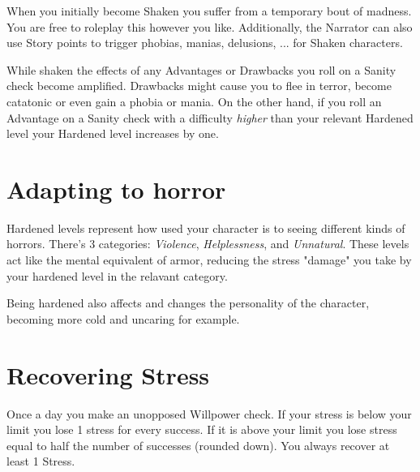 When you initially become Shaken you suffer from a temporary bout of madness. 
You are free to roleplay this however you like. 
Additionally, the Narrator can also use Story points to trigger 
phobias, manias, delusions, ... for Shaken characters.


While shaken the effects of any Advantages or Drawbacks you roll on a Sanity check become amplified.
Drawbacks might cause you to flee in terror, become catatonic or even gain a phobia or mania.
On the other hand, if you roll an Advantage on a Sanity check with a difficulty \textit{higher}
than your relevant Hardened level your Hardened level increases by one.




\section{Adapting to horror}

Hardened levels represent how used your character is to seeing different kinds of horrors.
There's 3 categories: \textit{Violence}, \textit{Helplessness}, and \textit{Unnatural}.
These levels act like the mental equivalent of armor, reducing the stress "damage" 
you take by your hardened level in the relavant category.

Being hardened also affects and changes the personality of the character, becoming more cold and uncaring for example.


\section{Recovering Stress}
Once a day you make an unopposed Willpower check. 
If your stress is below your limit you lose 1 stress for every success. 
If it is above your limit you lose stress equal to half the number of successes (rounded down).
You always recover at least 1 Stress.

